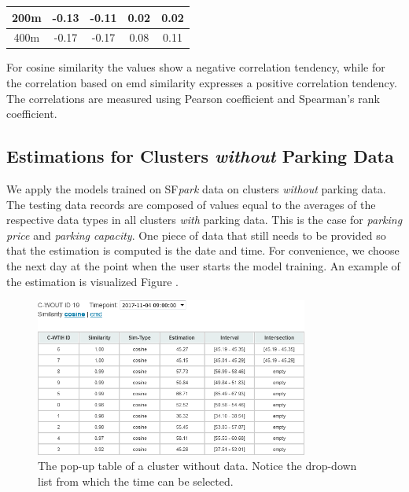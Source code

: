 \begin{table}[!ht]
{\begin{tabular}{ | c | c | c | c | c | }
			200m & -0.13 & -0.11 & 0.02 & 0.02 \\ \hline
			400m & -0.17 & -0.17 & 0.08 & 0.11 \\ \hline
		\end{tabular}}
		\label{tab:similarity_vs_estimation}
		\begin{tabnote}
			For cosine similarity the values show a negative correlation tendency, while for the correlation based on emd similarity expresses a positive correlation tendency. The correlations are measured using Pearson coefficient and Spearman's rank coefficient.
		\end{tabnote}
\end{table}	

\subsection{Estimations for Clusters \textit{without} Parking Data}
\label{evaluation:estimations_cwout}
We apply the models trained on SF\textit{park} data on clusters \textit{without} parking data.
The testing data records are composed of values equal to the averages of the respective data types in all clusters \textit{with} parking data.
This is the case for \textit{parking price} and \textit{parking capacity}.
One piece of data that still needs to be provided so that the estimation is computed is the date and time.
For convenience, we choose the next day at the point when the user starts the model training. 
An example of the estimation is visualized Figure .

\begin{figure}[!ht]
	\centering
	\includegraphics[width=0.8\textwidth]{graphics/cwout_cosine_table.png}
	\caption{The pop-up table of a cluster without data.
		Notice the drop-down list from which the time can be selected.}
	\label{fig:cwout_table}
\end{figure}

